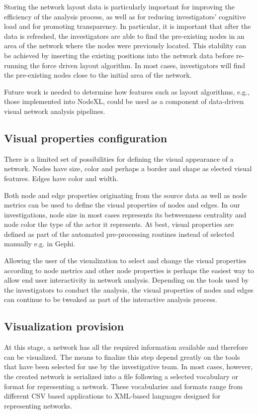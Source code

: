 Storing the network layout data is particularly important for improving the efficiency of the analysis process, as well as for reducing investigators’ cognitive load and for promoting transparency. In particular, it is important that after the data is refreshed, the investigators are able to find the pre-existing nodes in an area of the network where the nodes were previously located. This stability can be achieved by inserting the existing positions into the network data before re-running the force driven layout algorithm. In most cases, investigators will find the pre-existing nodes close to the initial area of the network.

Future work is needed to determine how features such as layout algorithms, e.g., those implemented into NodeXL, could be used as a component of data-driven visual network analysis pipelines. 

\subsection{Visual properties configuration}

There is a limited set of possibilities for defining the visual appearance of a network. Nodes have size, color and perhaps a border and shape as elected visual features. Edges have color and width.

Both node and edge properties originating from the source data as well as node metrics can be used to define the visual properties of nodes and edges. In our investigations, node size in most cases represents its betweenness centrality and node color the type of the actor it represents. At best, visual properties are defined as part of the automated pre-processing routines instead of selected manually e.g. in Gephi.

Allowing the user of the visualization to select and change the visual properties according to node metrics and other node properties is perhaps the easiest way to allow end user interactivity in network analysis. Depending on the tools used by the investigators to conduct the analysis, the visual properties of nodes and edges can continue to be tweaked as part of the interactive analysis process.

\subsection{Visualization provision}

At this stage, a network has all the required information available and therefore can be visualized. The means to finalize this step depend greatly on the tools that have been selected for use by the investigative team. In most cases, however, the created network is serialized into a file following a selected vocabulary or format for representing a network. These vocabularies and formats range from different CSV based applications to XML-based languages designed for representing networks.

